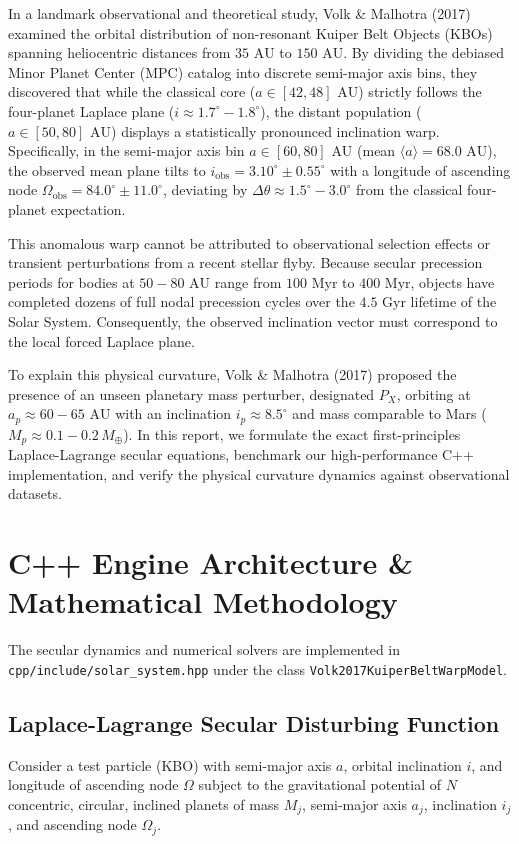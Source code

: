 \documentclass[11pt,a4paper]{article}
\begin{document}
In a landmark observational and theoretical study, Volk \& Malhotra (2017) examined the orbital distribution of non-resonant Kuiper Belt Objects (KBOs) spanning heliocentric distances from $35\text{ AU}$ to $150\text{ AU}$. By dividing the debiased Minor Planet Center (MPC) catalog into discrete semi-major axis bins, they discovered that while the classical core ($a \in [42, 48]\text{ AU}$) strictly follows the four-planet Laplace plane ($i \approx 1.7^\circ - 1.8^\circ$), the distant population ($a \in [50, 80]\text{ AU}$) displays a statistically pronounced inclination warp. Specifically, in the semi-major axis bin $a \in [60, 80]\text{ AU}$ (mean $\langle a \rangle = 68.0\text{ AU}$), the observed mean plane tilts to $i_{\text{obs}} = 3.10^\circ \pm 0.55^\circ$ with a longitude of ascending node $\Omega_{\text{obs}} = 84.0^\circ \pm 11.0^\circ$, deviating by $\Delta\theta \approx 1.5^\circ - 3.0^\circ$ from the classical four-planet expectation.

This anomalous warp cannot be attributed to observational selection effects or transient perturbations from a recent stellar flyby. Because secular precession periods for bodies at $50-80\text{ AU}$ range from $100\text{ Myr}$ to $400\text{ Myr}$, objects have completed dozens of full nodal precession cycles over the $4.5\text{ Gyr}$ lifetime of the Solar System. Consequently, the observed inclination vector must correspond to the local forced Laplace plane.

To explain this physical curvature, Volk \& Malhotra (2017) proposed the presence of an unseen planetary mass perturber, designated $P_X$, orbiting at $a_p \approx 60 - 65\text{ AU}$ with an inclination $i_p \approx 8.5^\circ$ and mass comparable to Mars ($M_p \approx 0.1 - 0.2\,M_\oplus$). In this report, we formulate the exact first-principles Laplace-Lagrange secular equations, benchmark our high-performance C++ implementation, and verify the physical curvature dynamics against observational datasets.

\section{C++ Engine Architecture \& Mathematical Methodology}
The secular dynamics and numerical solvers are implemented in \texttt{cpp/include/solar\_system.hpp} under the class \texttt{Volk2017KuiperBeltWarpModel}.

\subsection{Laplace-Lagrange Secular Disturbing Function}
Consider a test particle (KBO) with semi-major axis $a$, orbital inclination $i$, and longitude of ascending node $\Omega$ subject to the gravitational potential of $N$ concentric, circular, inclined planets of mass $M_j$, semi-major axis $a_j$, inclination $i_j$, and ascending node $\Omega_j$. 
\end{document}
